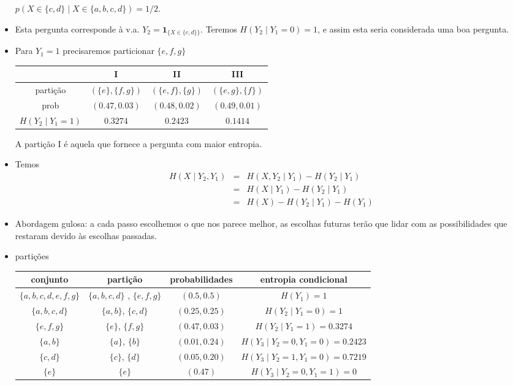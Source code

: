\begin{frame}[allowframebreaks]
\begin{itemize}
	$p(X \in \{c,d\} \mid X \in \{a,b,c,d\}) = 1/2$.
  \item Esta pergunta corresponde à v.a. $Y_2 = \mathbf{1}_{\{X \in \{c,d\}\}}$. Teremos $H(Y_2 \mid Y_1 = 0) = 1$, e assim
	esta seria considerada uma boa pergunta.
  \item Para $Y_1 = 1$ precisaremos particionar $\{e,f,g\}$
	\begin{tabular}{c|c|c|c}
		 & I & II & III \\ \hline
	partição & $(\{e\},\{f,g\})$ & $(\{e,f\},\{g\})$ & $(\{e,g\},\{f\})$ \\ \hline
	prob	 & $(0.47, 0.03)$ & $(0.48, 0.02)$ & $(0.49, 0.01)$ \\ \hline
	$H(Y_2 \mid Y_1 = 1)$ & $0.3274$ & $0.2423$ & $0.1414$
	\end{tabular}
	A partição I é aquela que fornece a pergunta com maior entropia.
  \item Temos
	\begin{eqnarray}
	H(X \mid Y_2, Y_1) &=& H(X,Y_2 \mid Y_1) - H(Y_2 \mid Y_1) \nonumber \\
			&=& H(X \mid Y_1) - H(Y_2 \mid Y_1) \nonumber \\
			&=& H(X) - H(Y_2 \mid Y_1) - H(Y_1)
	\end{eqnarray}
  \item Abordagem gulosa: a cada passo escolhemos o que nos parece melhor, as escolhas futuras terão que lidar
	com as possibilidades que restaram devido às escolhas passadas.
  \item partições
	\begin{scriptsize}
	\hspace*{-1cm}
	\begin{tabular}{c|c|c|c}
	conjunto	  & partição & probabilidades & entropia condicional \\ \hline
	$\{a,b,c,d,e,f,g\}$ 	& $\{a,b,c,d\}$ , $\{e,f,g\}$ 	& $(0.5, 0.5)$ 		& $H(Y_1) = 1$ \\ \hline
	$\{a,b,c,d\}$ 		& $\{a,b\}$, $\{c,d\}$		& $(0.25, 0.25)$ 	& $H(Y_2 \mid Y_1 = 0) = 1$ \\ \hline
	$\{e,f,g\}$		& $\{e\}$, $\{f,g\}$ 		& $(0.47, 0.03)$ 	& $H(Y_2 \mid Y_1 = 1) = 0.3274$ \\ \hline
	$\{a,b\}$		& $\{a\}$, $\{b\}$		& $(0.01, 0.24)$	& $H(Y_3 \mid Y_2 = 0, Y_1 = 0) = 0.2423$ \\ \hline
	$\{c,d\}$		& $\{c\}$, $\{d\}$		& $(0.05, 0.20)$	& $H(Y_3 \mid Y_2 = 1, Y_1 = 0) = 0.7219$ \\ \hline
	$\{e\}$			& $\{e\}$ 			& $(0.47)$		& $H(Y_3 \mid Y_2 = 0, Y_1 = 1) = 0$ \\ \hline

\end{tabular}
\end{scriptsize}
\end{itemize}
\end{frame}
